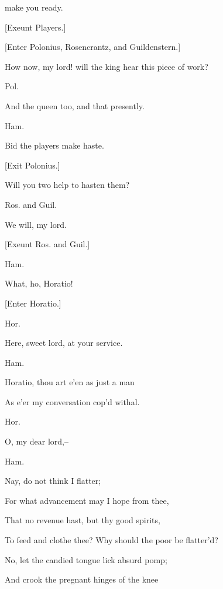 \documentclass[12pt]{book}
\begin{document}
make you ready.



[Exeunt Players.]



[Enter Polonius, Rosencrantz, and Guildenstern.]



How now, my lord! will the king hear this piece of work?



Pol.

And the queen too, and that presently.



Ham.

Bid the players make haste.



[Exit Polonius.]



Will you two help to hasten them?



Ros. and Guil.

We will, my lord.



[Exeunt Ros. and Guil.]



Ham.

What, ho, Horatio!



[Enter Horatio.]



Hor.

Here, sweet lord, at your service.



Ham.

Horatio, thou art e'en as just a man

As e'er my conversation cop'd withal.



Hor.

O, my dear lord,--



Ham.

Nay, do not think I flatter;

For what advancement may I hope from thee,

That no revenue hast, but thy good spirits,

To feed and clothe thee? Why should the poor be flatter'd?

No, let the candied tongue lick absurd pomp;

And crook the pregnant hinges of the knee
\end{document}

